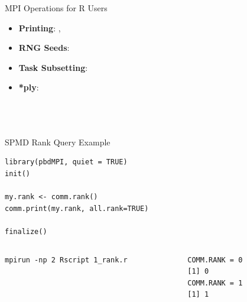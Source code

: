 \begin{frame}
  \begin{block}{MPI Operations for R Users}\pause
    \begin{itemize}
      \item \textbf{Printing}:  , \\[.4cm]
      \item \textbf{RNG Seeds}: \\[.4cm]
      \item \textbf{Task Subsetting}: \\[.4cm]
      \item \textbf{*ply}: \\
      \\
      \\
      \\
    \end{itemize}
  \end{block}
\end{frame}


\begin{frame}[fragile]
  \begin{exampleblock}{SPMD Rank Query Example}
  \centering
\begin{lstlisting}[title=1\_rank.r]
library(pbdMPI, quiet = TRUE)
init()

my.rank <- comm.rank()
comm.print(my.rank, all.rank=TRUE)

finalize()
\end{lstlisting}
  \begin{columns}[t,onlytextwidth]
    \begin{column}{0.62\textwidth}
\begin{lstlisting}[backgroundcolor=\color{white},keywordstyle=\color{black},
title=Execute this batch script via:]
mpirun -np 2 Rscript 1_rank.r
\end{lstlisting}    
    \end{column}
    \hfill
    \begin{column}{0.35\textwidth}
\begin{lstlisting}[title=Sample Output:]
COMM.RANK = 0
[1] 0
COMM.RANK = 1
[1] 1
\end{lstlisting}
    \end{column}
​  \end{columns}
  \end{exampleblock}
\end{frame}

